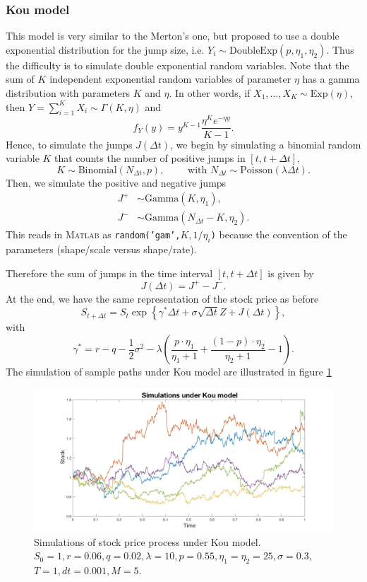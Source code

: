 \subsubsection{Kou model}
This model is very similar to the Merton's one, but \citeauthor{Kou02} proposed to use a double exponential distribution for the jump size, i.e. $Y_i\sim\text{DoubleExp}(p,\eta_1,\eta_2)$. Thus the difficulty is to simulate double exponential random variables. Note that the sum of $K$ independent exponential random variables of parameter $\eta$ has a gamma distribution with parameters $K$ and $\eta$. In other words, if $X_1,\ldots,X_K\sim\text{Exp}(\eta)$, then $Y = \sum_{i=1}^K X_i\sim\Gamma(K,\eta)$ and
$$f_Y(y) = y^{K-1}\frac{\eta^K e^{-\eta y}}{K-1}.$$
Hence, to simulate the jumps $J(\Delta t)$, we begin by simulating a binomial random variable $K$ that counts the number of positive jumps in $[t,t+\Delta t]$,
$$K \sim \text{Binomial}(N_{\Delta t},p), \qquad \text{ with } N_{\Delta t}\sim \text{Poisson}(\lambda\Delta t).$$
Then, we simulate the positive and negative jumps
\begin{align*}
J^+&\sim\text{Gamma}(K,\eta_1), \\
J^-&\sim\text{Gamma}(N_{\Delta t}-K,\eta_2).
\end{align*}
This reads in \textsc{Matlab} as \texttt{random('gam',$K,1/\eta_i$)} because the convention of the parameters (shape/scale versus shape/rate).

Therefore the sum of jumps in the time interval $[t,t+\Delta t]$ is given by
$$J(\Delta t) = J^+-J^-.$$
At the end, we have the same representation of the stock price as before
$$S_{t+\Delta t} = S_t\exp\left\{\gamma^\ast \Delta t + \sigma \sqrt{\Delta t}Z + J(\Delta t)\right\},$$
with
$$ \gamma^\ast=r-q- \frac{1}{2}\sigma^2 -\lambda \left(\frac{p\cdot\eta_1}{\eta_1+1}+\frac{(1-p)\cdot\eta_2}{\eta_2+1}-1\right).$$
The simulation of sample paths under Kou model are illustrated in figure \ref{fig:MC:Kou}
\begin{figure}[!htb]
	\includegraphics[width=\textwidth]{gfx/Kou_plot}
	\caption{Simulations of stock price process under Kou model.\\ $S_0=1, r= 0.06,q = 0.02,\lambda = 10 , p = 0.55, \eta_1 =\eta_2= 25, \sigma=0.3,$\\$T = 1, dt = 0.001, M=5$.}
	\label{fig:MC:Kou}
\end{figure}

